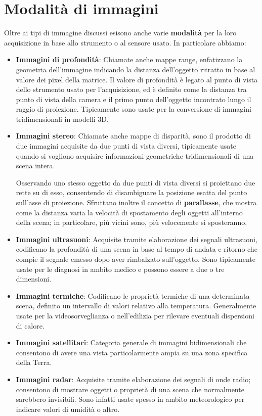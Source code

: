 %

\section{Modalità di immagini}
Oltre ai tipi di immagine discussi esisono anche varie \textbf{modalità} per la loro acquisizione in base allo strumento o al sensore usato. In
particolare abbiamo: \begin{itemize}
	\item \textbf{Immagini di profondità}: Chiamate anche mappe range, enfatizzano la geometria dell'immagine indicando la distanza dell'oggetto
	ritratto in base al valore dei pixel della matrice. Il valore di profondità è legato al punto di vista dello strumento usato per l'acquisizione, ed
	è definito come la distanza tra punto di vista della camera e il primo punto dell'oggetto incontrato lungo il raggio di proiezione. Tipicamente sono
	usate per la conversione di immagini tridimensionali in modelli 3D.
	\item \textbf{Immagini stereo}: Chiamate anche mappe di disparità, sono il prodotto di due immagini acquisite da due punti di vista diversi,
	tipicamente usate quando si vogliono acquisire informazioni geometriche tridimensionali di una scena intera.\par
	Osservando uno stesso oggetto da due punti di vista diversi si proiettano due rette su di esso, consentendo di disambiguare la posizione esatta del
	punto sull'asse di proiezione. Sfruttano inoltre il concetto di \textbf{parallasse}, che mostra come la distanza varia la velocità di spostamento
	degli oggetti all'interno della scena; in particolare, più vicini sono, più velocemente si sposteranno.
	\item \textbf{Immagini ultrasuoni}: Acquisite tramite elaborazione dei segnali ultrasuoni, codificano la profondità di una scena in base al tempo di
	andata e ritorno che compie il segnale emesso dopo aver rimbalzato sull'oggetto. Sono tipicamente usate per le diagnosi in ambito medico e possono
	essere a due o tre dimensioni.
	\item \textbf{Immagini termiche}: Codificano le proprietà termiche di una determinata scena, definito un intervallo di valori relativo alla
	temperatura. Generalmente usate per la videosorveglianza o nell'edilizia per rilevare eventuali dispersioni di calore.
	\item \textbf{Immagini satellitari}: Categoria generale di immagini bidimensionali che consentono di avere una vista particolarmente ampia su una
	zona specifica della Terra.
	\item \textbf{Immagini radar}: Acquisite tramite elaborazione dei segnali di onde radio; consentono di mostrare oggetti o proprietà di una scena
	che normalmente sarebbero invisibili. Sono infatti usate spesso in ambito meteorologico per indicare valori di umidità o altro.
\end{itemize}

